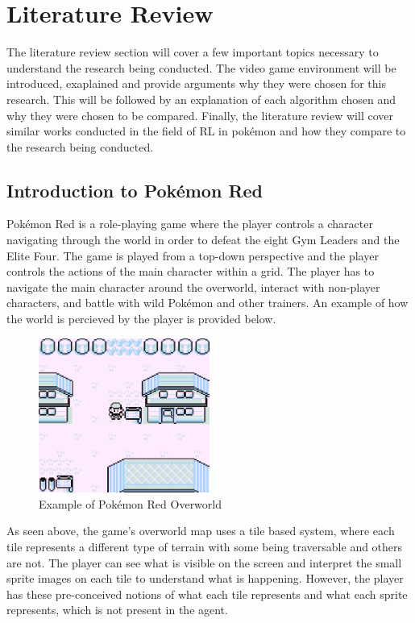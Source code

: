 \section{Literature Review}

The literature review section will cover a few important topics necessary to understand the research being conducted. The video game environment will be introduced, exaplained and provide arguments why they were chosen for this research. This will be followed by an explanation of each algorithm chosen and why they were chosen to be compared. Finally, the literature review will cover similar works conducted in the field of RL in pokémon and how they compare to the research being conducted.

\subsection{Introduction to Pokémon Red}


Pokémon Red is a role-playing game where the player controls a character navigating through the world in order to defeat the eight Gym Leaders and the Elite Four. The game is played from a top-down perspective and the player controls the actions of the main character within a grid. The player has to navigate the main character around the overworld, interact with non-player characters, and battle with wild Pokémon and other trainers. An example of how the world is percieved by the player is provided below\cite{HubZ_1998}. 

\begin{figure}[H]
    \centering
    \includegraphics[width=0.5\textwidth]{figures/red_pallet_town.png}
    \caption{Example of Pokémon Red Overworld}
    \label{fig:pkmn_overworld}
\end{figure}

As seen above, the game's overworld map uses a tile based system, where each tile represents a different type of terrain with some being traversable and others are not. The player can see what is visible on the screen and interpret the small sprite images on each tile to understand what is happening. However, the player has these pre-conceived notions of what each tile represents and what each sprite represents, which is not present in the agent\cite{HubZ_1998}. 

